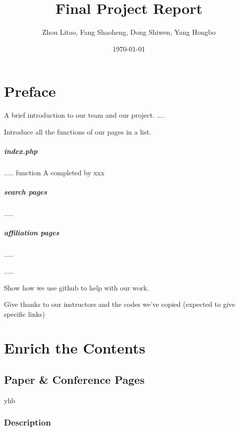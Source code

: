 \documentclass{book}
\begin{document}
\title{Final Project Report}
\author{Zhou Litao, Fang Shaoheng, Dong Shiwen, Yang Hongbo}
\date{\today}


\maketitle


\tableofcontents





\frontmatter
\chapter {Preface}

A brief introduction to our team and our project. .... 

Introduce all the functions of our pages in a list. 

\paragraph{index.php}..... function A completed by xxx

\paragraph{search pages}.....

\paragraph{affiliation pages}.....

.....

Show how we use github to help with our work.

Give thanks to our instructors and the codes we've copied (expected to give specific links)


\mainmatter
\chapter {Enrich the Contents}

\section {Paper \& Conference Pages}

yhb

\subsection{Description}
\end{document}
